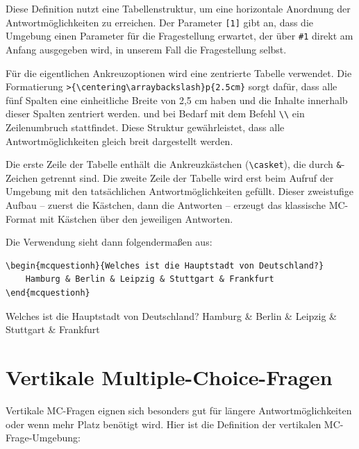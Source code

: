 Diese Definition nutzt eine Tabellenstruktur, um eine horizontale Anordnung der Antwortmöglichkeiten zu erreichen. Der Parameter \texttt{[1]} gibt an, dass die Umgebung einen Parameter für die Fragestellung erwartet, der über \texttt{\#1} direkt am Anfang ausgegeben wird, in unserem Fall die Fragestellung selbst.

Für die eigentlichen Ankreuzoptionen wird eine zentrierte Tabelle verwendet. Die Formatierung \texttt{\textgreater\{\textbackslash centering\textbackslash arraybackslash\}p\{2.5cm\}} sorgt dafür, dass alle fünf Spalten eine einheitliche Breite von 2,5 cm haben und die Inhalte innerhalb dieser Spalten zentriert werden. und bei Bedarf mit dem Befehl \texttt{\textbackslash\textbackslash} ein Zeilenumbruch stattfindet. Diese Struktur gewährleistet, dass alle Antwortmöglichkeiten gleich breit dargestellt werden.

Die erste Zeile der Tabelle enthält die Ankreuzkästchen (\texttt{\textbackslash casket}), die durch \texttt{\&}-Zeichen getrennt sind. Die zweite Zeile der Tabelle wird erst beim Aufruf der Umgebung mit den tatsächlichen Antwortmöglichkeiten gefüllt. Dieser zweistufige Aufbau – zuerst die Kästchen, dann die Antworten – erzeugt das klassische MC-Format mit Kästchen über den jeweiligen Antworten. 

Die Verwendung sieht dann folgendermaßen aus:

\begin{lstlisting}[style=latex]
\begin{mcquestionh}{Welches ist die Hauptstadt von Deutschland?}
	Hamburg & Berlin & Leipzig & Stuttgart & Frankfurt
\end{mcquestionh}
\end{lstlisting}

\begin{ausgabe}
	\begin{mcquestionh}{Welches ist die Hauptstadt von Deutschland?}
		Hamburg & Berlin & Leipzig & Stuttgart & Frankfurt
	\end{mcquestionh}
\end{ausgabe}



\section{Vertikale Multiple-Choice-Fragen}

Vertikale MC-Fragen eignen sich besonders gut für längere Antwortmöglichkeiten oder wenn mehr Platz benötigt wird. Hier ist die Definition der vertikalen MC-Frage-Umgebung:

